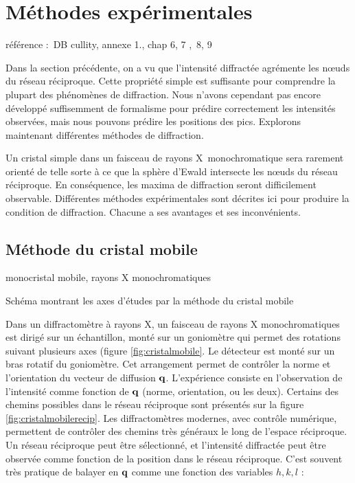 \chapter{Méthodes expérimentales}

référence : DB cullity, annexe 1., chap 6, 7 , 8, 9

Dans la section précédente, on a vu que l'intensité diffractée agrémente les nœuds du réseau réciproque. Cette propriété simple est suffisante pour comprendre la plupart des phénomènes de diffraction.
Nous n'avons cependant pas encore développé suffisemment de formalisme pour prédire correctement les intensités observées, mais nous pouvons prédire les positions des pics. Explorons maintenant différentes méthodes de diffraction.

Un cristal simple dans un faisceau de rayons X monochromatique sera rarement orienté de telle sorte à ce que la sphère d'Ewald intersecte les nœuds du réseau réciproque. En conséquence, les maxima de diffraction seront difficilement observable. Différentes méthodes expérimentales sont décrites ici pour produire la condition de diffraction. Chacune a ses avantages et ses inconvénients.

\section{Méthode du cristal mobile}
monocristal mobile, rayons X monochromatiques

\begin{marginfigure}
    \TODO
    \caption{Schéma montrant les axes d'études par la méthode du cristal mobile}
    \label{fig:cristalmobile}
\end{marginfigure}

Dans un diffractomètre à rayons X, un faisceau de rayons X monochromatiques est dirigé sur un échantillon, monté sur un goniomètre qui permet des rotations suivant plusieurs axes (figure \ref{fig:cristalmobile}. Le détecteur est monté sur un bras rotatif du goniomètre. Cet arrangement permet de contrôler la norme et l'orientation du vecteur de diffusion $\mathbf{q}$. L'expérience consiste en l'observation de l'intensité comme fonction de $\mathbf{q}$ (norme, orientation, ou les deux). Certains des chemins possibles dans le réseau réciproque sont présentés sur la figure \ref{fig:cristalmobilerecip}. Les diffractomètres modernes, avec contrôle numérique, permettent de contrôler des chemins très généraux le long de l'espace réciproque.
Un réseau réciproque peut être sélectionné, et l'intensité diffractée peut être observée comme fonction de la position dans le réseau réciproque. C'est souvent très pratique de balayer en $\mathbf{q}$ comme une fonction des variables $h,k,l$ :

